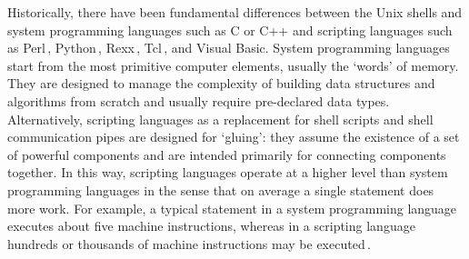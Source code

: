 \documentclass[12pt]{article}
\begin{document}
Historically, there have been fundamental differences between the Unix
shells and system programming languages such as C or C++ and scripting
languages such as Perl\,\cite{wall99:_perl_progr_refer_guide},
Python\,\cite{martelli06:_python_nutsh},
Rexx\,\cite{ohara88:_moder_progr_using_rexx},
Tcl\,\cite{ousterhout94:_tcl_tk_toolk}, and Visual Basic.  System
programming languages start from the most primitive computer elements,
usually the `words' of memory. They are designed to manage the
complexity of building data structures and algorithms from scratch and
usually require pre-declared data types.  Alternatively, scripting
languages as a replacement for shell scripts and shell communication
pipes are designed for `gluing': they assume the existence of a set of
powerful components and are intended primarily for connecting
components together.
In this way, scripting languages operate at a higher level than system
programming languages in the sense that on average a single statement
does more work.  For example, a typical statement in a system
programming language executes about five machine instructions, whereas
in a scripting language hundreds or thousands of machine instructions
may be executed\,\cite{ousterhout98:_scrip}.


\end{document}
